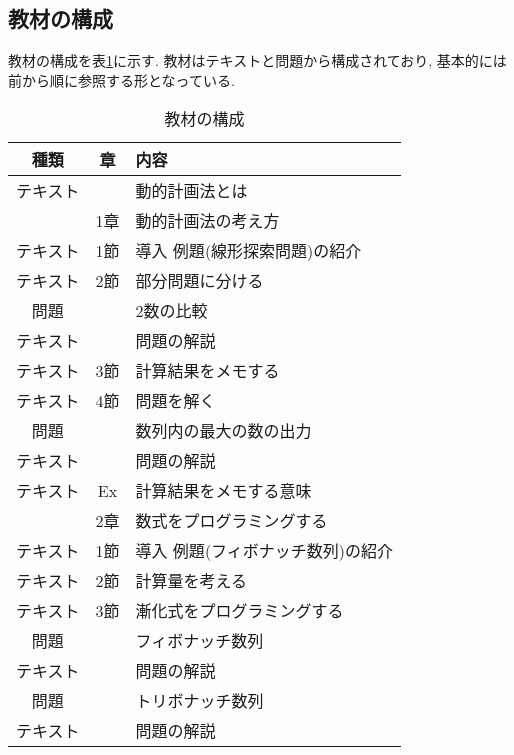 \clearpage

\subsection{教材の構成}

教材の構成を表\ref{tab:composition}に示す. 
教材はテキストと問題から構成されており, 基本的には前から順に参照する形となっている. 

\begin{table}[H]
    \caption{教材の構成}
    \begin{center}
    \label{tab:composition}
    \begin{tabular}{|c|c|l|} \hline
    
    種類 & 章 & 内容 \\ \hline
    \hline
    テキスト &  & 動的計画法とは  \\ \hline

     & 1章 & 動的計画法の考え方 \\ \hline
    テキスト & 1節 & 導入 例題(線形探索問題)の紹介 \\ \hline
    テキスト & 2節 & 部分問題に分ける \\ \hline
    問題 & & 2数の比較 \\ \hline
    テキスト & & 問題の解説 \\ \hline
    テキスト & 3節 & 計算結果をメモする \\ \hline
    テキスト & 4節 & 問題を解く \\ \hline
    問題 & & 数列内の最大の数の出力 \\ \hline
    テキスト & & 問題の解説 \\ \hline
    テキスト & Ex & 計算結果をメモする意味 \\ \hline

     & 2章 & 数式をプログラミングする \\ \hline
    テキスト & 1節 & 導入 例題(フィボナッチ数列)の紹介 \\ \hline
    テキスト & 2節 & 計算量を考える \\ \hline
    テキスト & 3節 & 漸化式をプログラミングする \\ \hline
    問題 & & フィボナッチ数列 \\ \hline
    テキスト & & 問題の解説 \\ \hline
    問題 & & トリボナッチ数列 \\ \hline
    テキスト & & 問題の解説 \\ \hline
    \end{tabular}
    \end{center}
\end{table}


